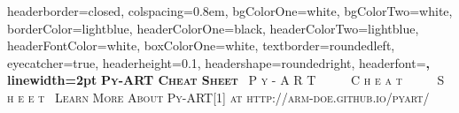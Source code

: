 \documentclass[potrait,a0paper,fontscale=0.33]{baposter} %
\begin{document}
\begin{poster}
{
headerborder=closed, colspacing=0.8em, bgColorOne=white, bgColorTwo=white, borderColor=lightblue, headerColorOne=black, headerColorTwo=lightblue, 
headerFontColor=white, boxColorOne=white, textborder=roundedleft, eyecatcher=true, headerheight=0.1\textheight, headershape=roundedright, headerfont=\Large\bf\textsc, linewidth=2pt 
}
{\bf\textsc{Py-ART Cheat Sheet}\vspace{0.5em}} %
{\textsc{\ P y - A R T \ \ \ \ \ C h e a t \ \ \ \ \ S h e e t\ \hspace{12pt}}}
{\textsc{{\textsc{Learn More About Py-ART[1] at http://arm-doe.github.io/pyart/ \hspace{12pt}}} \hspace{12pt}}} 



\end{poster}
\end{document}
